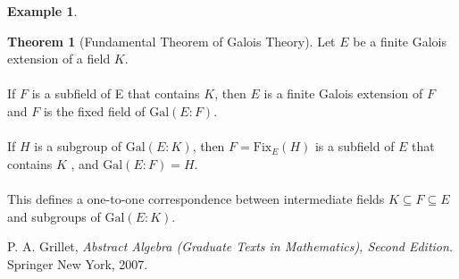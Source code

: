 \documentclass[11pt]{amsbook}%
\theoremstyle{plain}
\theoremstyle{definition}
\newtheorem*{example*}{Example}
\newtheorem{theorem}{Theorem}
\numberwithin{equation}{section}
\newcommand{\Gal}{\text{Gal}}
\newcommand{\Fix}{\text{Fix}}
\DeclareMathOperator{\Gal}{Gal}
\begin{document}
\begin{example*}
\begin{theorem}[Fundamental Theorem of Galois Theory]
  Let $E$ be a finite Galois extension of a field $K$. \\ \\
  If $F$ is a subfield of E that contains $K$, then $E$ is a finite Galois extension of
  $F$ and $F$ is the fixed field of $\Gal(E:F)$. \\ \\
  If $H$ is a subgroup of $\Gal(E:K)$, then $F = \Fix_{E}(H)$ is a subfield of $E$ that
  contains $K$ , and $\Gal(E:F) = H$. \\ \\
  This defines a one-to-one correspondence between intermediate fields $K \subseteq F \subseteq E$
  and subgroups of $\Gal(E:K)$.
\end{theorem} \vspace{1.8em}

%
%
%
%
%


\def\arXiv#1{\href{http://arxiv.org/abs/#1}{arXiv:#1}}

\begin{thebibliography}{0}
 
  P. A. Grillet,
   \emph{Abstract Algebra (Graduate Texts in Mathematics), Second Edition. \/}
   Springer New York, 2007. \\


\end{thebibliography}
\end{example*}
\end{document}
